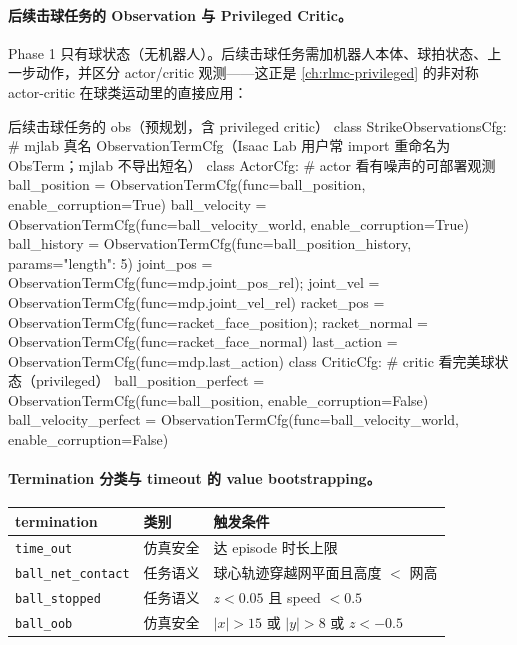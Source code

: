 \paragraph{后续击球任务的 Observation 与 Privileged Critic。}Phase 1 只有球状态（无机器人）。后续击球任务需加机器人本体、球拍状态、上一步动作，并区分 actor/critic 观测——这正是 \cref{ch:rlmc-privileged} 的非对称 actor-critic 在球类运动里的直接应用：

\begin{codebox}[Python]{后续击球任务的 obs（预规划，含 privileged critic）}
class StrikeObservationsCfg:
    # mjlab 真名 ObservationTermCfg（Isaac Lab 用户常 import 重命名为 ObsTerm；mjlab 不导出短名）
    class ActorCfg:    # actor 看有噪声的可部署观测
        ball_position = ObservationTermCfg(func=ball_position,       enable_corruption=True)
        ball_velocity = ObservationTermCfg(func=ball_velocity_world, enable_corruption=True)
        ball_history  = ObservationTermCfg(func=ball_position_history, params={"length": 5})
        joint_pos = ObservationTermCfg(func=mdp.joint_pos_rel); joint_vel = ObservationTermCfg(func=mdp.joint_vel_rel)
        racket_pos = ObservationTermCfg(func=racket_face_position); racket_normal = ObservationTermCfg(func=racket_face_normal)
        last_action = ObservationTermCfg(func=mdp.last_action)
    class CriticCfg:   # critic 看完美球状态（privileged）
        ball_position_perfect = ObservationTermCfg(func=ball_position,       enable_corruption=False)
        ball_velocity_perfect = ObservationTermCfg(func=ball_velocity_world, enable_corruption=False)
\end{codebox}

\paragraph{Termination 分类与 timeout 的 value bootstrapping。}

\begin{center}
\small
\begin{tabular}{@{}llp{5.0cm}@{}}
\toprule
termination & 类别 & 触发条件 \\
\midrule
\verb|time_out| & 仿真安全 & 达 episode 时长上限 \\
\verb|ball_net_contact| & 任务语义 & 球心轨迹穿越网平面且高度 $<$ 网高 \\
\verb|ball_stopped| & 任务语义 & $z<0.05$ 且 speed $<0.5$ \\
\verb|ball_oob| & 仿真安全 & $|x|>15$ 或 $|y|>8$ 或 $z<-0.5$ \\
\bottomrule
\end{tabular}
\end{center}

